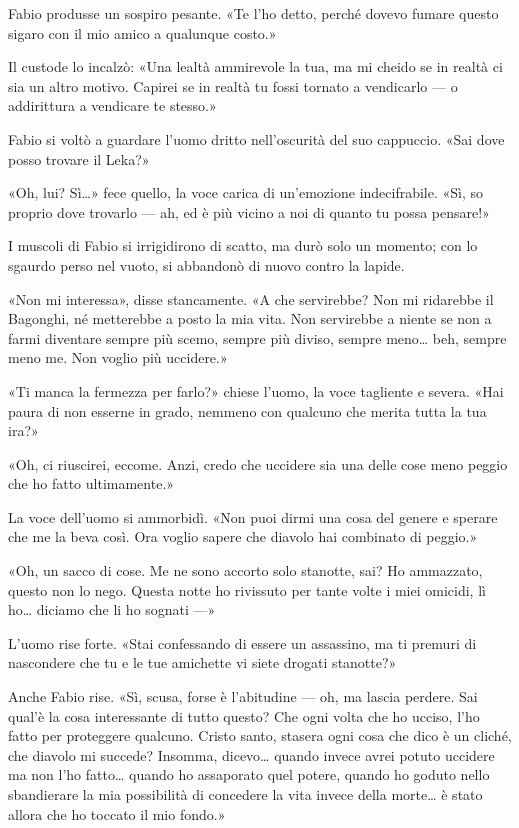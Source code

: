 Fabio produsse un sospiro pesante. «Te l'ho detto, perché dovevo fumare questo sigaro con il mio amico a qualunque costo.»

Il custode lo incalzò: «Una lealtà ammirevole la tua, ma mi cheido se in realtà ci sia un altro motivo. Capirei se in realtà tu fossi tornato a vendicarlo --- o addirittura a vendicare te stesso.»

Fabio si voltò a guardare l'uomo dritto nell'oscurità del suo cappuccio. «Sai dove posso trovare il Leka?»

«Oh, lui? Sì\ldots{}» fece quello, la voce carica di un'emozione indecifrabile. «Sì, so proprio dove trovarlo --- ah, ed è più vicino a noi di quanto tu possa pensare!»

I muscoli di Fabio si irrigidirono di scatto, ma durò solo un momento; con lo sgaurdo perso nel vuoto, si abbandonò di nuovo contro la lapide. 

«Non mi interessa», disse stancamente. «A che servirebbe? Non mi ridarebbe il Bagonghi, né metterebbe a posto la mia vita. Non servirebbe a niente se non a farmi diventare sempre più scemo, sempre più diviso, sempre meno\ldots{} beh, sempre meno me. Non voglio più uccidere.»

«Ti manca la fermezza per farlo?» chiese l'uomo, la voce tagliente e severa. «Hai paura di non esserne in grado, nemmeno con qualcuno che merita tutta la tua ira?»

«Oh, ci riuscirei, eccome. Anzi, credo che uccidere sia una delle cose meno peggio che ho fatto  ultimamente.»

La voce dell'uomo si ammorbidì. «Non puoi dirmi una cosa del genere e sperare che me la beva così. Ora voglio sapere che diavolo hai combinato di peggio.»

«Oh, un sacco di cose. Me ne sono accorto solo stanotte, sai? Ho ammazzato, questo non lo nego. Questa notte ho rivissuto per tante volte i miei omicidi, lì ho\ldots{} diciamo che li ho sognati ---»

L'uomo rise forte. «Stai confessando di essere un assassino, ma ti premuri di nascondere che tu e le tue amichette vi siete drogati stanotte?»

Anche Fabio rise. «Sì, scusa, forse è l'abitudine --- oh, ma lascia perdere. Sai qual'è la cosa interessante di tutto questo? Che ogni volta che ho ucciso, l'ho fatto per proteggere qualcuno. Cristo santo, stasera ogni cosa che dico è un cliché, che diavolo mi succede? Insomma, dicevo\ldots{} quando invece avrei potuto uccidere ma non l'ho fatto\ldots{} quando ho assaporato quel potere, quando ho goduto nello sbandierare la mia possibilità di concedere la vita invece della morte\ldots{} è stato allora che ho toccato il mio fondo.»

